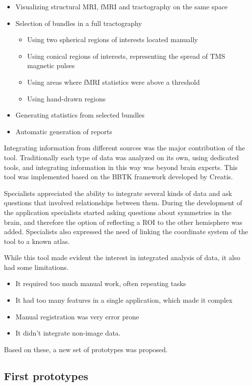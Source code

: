 \begin{itemize}
\item Visualizing structural MRI, fMRI and tractography on the same space
\item Selection of bundles in a full tractography
\begin{itemize}
\item Using two spherical regions of interests located manually
\item Using conical regions of interests, representing the spread of TMS magnetic pulses
\item Using areas where fMRI statistics were above a threshold
\item Using hand-drawn regions
\end{itemize}
\item Generating statistics from selected bundles
\item Automatic generation of reports
\end{itemize}

Integrating information from different sources was the major contribution of the tool. Traditionally each type of data was analyzed on its own, using dedicated tools, and integrating information in this way was beyond brain experts. This tool was implemented based on the BBTK framework \autocite{hoyos_creatools:_2012} developed by Creatis.

Specialists appreciated the ability to integrate several kinds of data and ask questions that involved relationships between them. During the development of the application specialists started asking questions about symmetries in the brain, and therefore the option of reflecting a ROI to the other hemisphere was added. Specialists also expressed the need of linking the coordinate system of the tool to a known atlas.

While this tool made evident the interest in integrated analysis of data, it also had some limitations.
\begin{itemize}
\item It required too much manual work, often repeating tasks
\item It had too many features in a single application, which made it complex
\item Manual registration was very error prone
\item It didn't integrate non-image data.
\end{itemize}
Based on these, a new set of prototypes was proposed.

\subsection{First prototypes}

